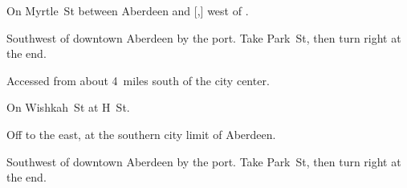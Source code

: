 
\begin{LocationList}

On Myrtle~St between Aberdeen and [,] west of .

Southwest of downtown Aberdeen by the port.
Take Park~St, then turn right at the end.

Accessed from  about 4~miles south of the city center.

On Wishkah~St at H~St.

Off  to the east, at the southern city limit of Aberdeen.

Southwest of downtown Aberdeen by the port.
Take Park~St, then turn right at the end.

\end{LocationList}

